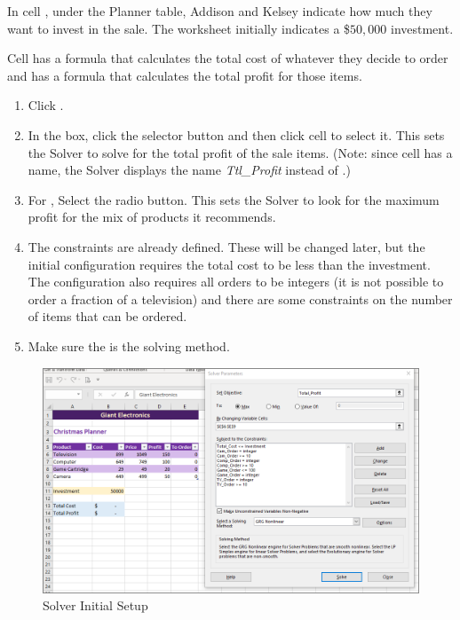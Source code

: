 In cell , under the Planner table, Addison and Kelsey indicate how much they want to invest in the sale. The worksheet initially indicates a \$$ 50,000 $ investment.

Cell  has a formula that calculates the total cost of whatever they decide to order and  has a formula that calculates the total profit for those items.

\begin{enumerate}
	\item Click .
	\item In the  box, click the selector button and then click cell  to select it. This sets the Solver to solve for the total profit of the sale items. (Note: since cell  has a name, the Solver displays the name \textit{Ttl\_Profit} instead of .)
	\item For , Select the  radio button. This sets the Solver to look for the maximum profit for the mix of products it recommends.
	\item The constraints are already defined. These will be changed later, but the initial configuration requires the total cost to be less than the investment. The configuration also requires all orders to be integers (it is not possible to order a fraction of a television) and there are some constraints on the number of items that can be ordered.
	\item Make sure the  is the solving method.
\end{enumerate}

\begin{figure}[H]
	\centering
	\includegraphics[width=\maxwidth{.95\linewidth}]{gfx/ch08_fig44}
	\caption{Solver Initial Setup}
	\label{08:fig44}
\end{figure}

